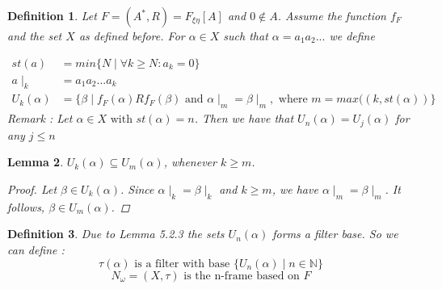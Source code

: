 \documentclass[12pt, a4paper]{scrartcl}
\newtheorem{definition}{Definition}[subsection]
\newtheorem{lemma}[definition]{Lemma}
\begin{document}
\begin{definition}
    Let $F = (A^*, R) = F_{\xi \eta}[A]$ and $0 \notin A$. Assume the function $f_F$ and the set $X$ as defined before.
    For $\alpha \in X$ such that $\alpha = a_1a_2...$ we define 
    
    \begin{align*}
            st(a) &= min\{N \mid \forall k \geq N : a_k = 0\} \\
            a \mid_{k} &= a_1a_2...a_k \\
            U_k(\alpha) &= \{ \beta \mid f_F(\alpha)Rf_F(\beta) \mbox{ and } \alpha \mid_m = \beta \mid_m,  \mbox{ where } m = max((k, st(\alpha))\} 
    \end{align*} 
    Remark : Let $\alpha \in X \mbox{ with } st(\alpha) = n$. Then we have that $U_n(\alpha) = U_j(\alpha)$ for any $j \leq n$

\end{definition}

\begin{lemma}
    $U_k(\alpha) \subseteq U_m(\alpha)$, whenever $k \geq m$.
    
    \begin{proof}
        Let $\beta \in U_k(\alpha)$. Since $\alpha \mid_k = \beta \mid_k$ and $k \geq m$, we have $\alpha \mid_m = \beta \mid_m$. It follows, $\beta \in U_m(\alpha)$.
    \end{proof}
\end{lemma}

\begin{definition}
    Due to Lemma 5.2.3 the sets $U_n(\alpha)$ forms a filter base. So we can define :
    $$\tau(\alpha) \mbox{ is a filter with base } \{U_n(\alpha) \mid n \in \mathbb{N} \}$$
    $$N_\omega = (X, \tau) \mbox{ is the n-frame based on } F$$

\end{definition}
\end{document}
